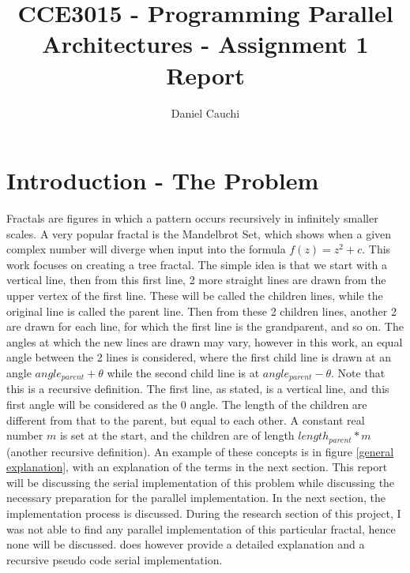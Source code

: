 \documentclass[11pt]{article}
\begin{document}
\title{CCE3015 - Programming Parallel Architectures - Assignment 1 Report}
\author{Daniel Cauchi}
\date{}
\maketitle

\section{Introduction - The Problem} \label{intro}
Fractals are figures in which a pattern occurs recursively in infinitely smaller scales. A very popular fractal is the Mandelbrot Set, which shows when a given complex number will diverge when input into the formula $f(z) = z^2 + c$. This work focuses on creating a tree fractal. The simple idea is that we start with a vertical line, then from this first line, 2 more straight lines are drawn from the upper vertex of the first line. These will be called the children lines, while the original line is called the parent line. Then from these 2 children lines, another 2 are drawn for each line, for which the first line is the grandparent, and so on. The angles at which the new lines are drawn may vary, however in this work, an equal angle between the 2 lines is considered, where the first child line is drawn at an angle $angle_{parent} + \theta$ while the second child line is at $angle_{parent} - \theta$. Note that this is a recursive definition. The first line, as stated, is a vertical line, and this first angle will be considered as the 0 angle. The length of the children are different from that to the parent, but equal to each other. A constant real number $m$ is set at the start, and the children are of length $length_{parent} * m$ (another recursive definition). An example of these concepts is in figure \ref{general explanation}, with an explanation of the terms in the next section. This report will be discussing the serial implementation of this problem while discussing the necessary preparation for the parallel implementation. In the next section, the implementation process is discussed. During the research section of this project, I was not able to find any parallel implementation of this particular fractal, hence none will be discussed. \cite{natureofcode} does however provide a detailed explanation and a recursive pseudo code serial implementation.
\end{document}
